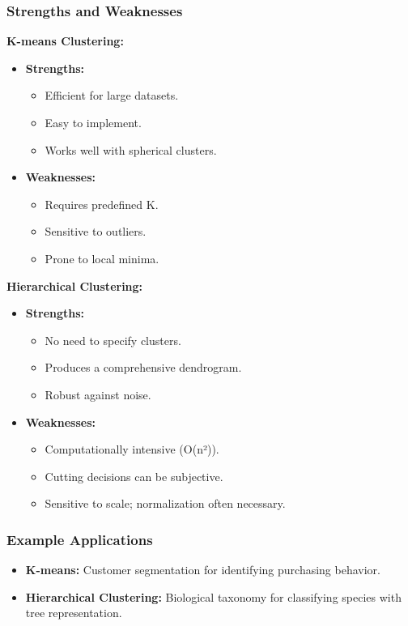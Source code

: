 \documentclass[aspectratio=169]{beamer}
\begin{document}
\begin{frame}[fragile]
    \frametitle{Strengths and Weaknesses}
    \textbf{K-means Clustering:}
    \begin{itemize}
        \item \textbf{Strengths:}
        \begin{itemize}
            \item Efficient for large datasets.
            \item Easy to implement.
            \item Works well with spherical clusters.
        \end{itemize}
        \item \textbf{Weaknesses:}
        \begin{itemize}
            \item Requires predefined K.
            \item Sensitive to outliers.
            \item Prone to local minima.
        \end{itemize}
    \end{itemize}

    \textbf{Hierarchical Clustering:}
    \begin{itemize}
        \item \textbf{Strengths:}
        \begin{itemize}
            \item No need to specify clusters.
            \item Produces a comprehensive dendrogram.
            \item Robust against noise.
        \end{itemize}
        \item \textbf{Weaknesses:}
        \begin{itemize}
            \item Computationally intensive (O(n²)).
            \item Cutting decisions can be subjective.
            \item Sensitive to scale; normalization often necessary.
        \end{itemize}
    \end{itemize}
\end{frame}

\begin{frame}[fragile]
    \frametitle{Example Applications}
    \begin{itemize}
        \item \textbf{K-means:} Customer segmentation for identifying purchasing behavior.
        \item \textbf{Hierarchical Clustering:} Biological taxonomy for classifying species with tree representation.
    \end{itemize}
\end{frame}
\end{document}
